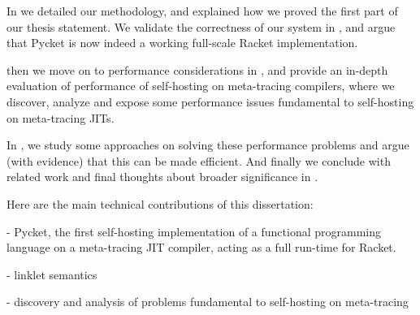     \begin{paragraph-here}%
        In  we detailed our methodology, and explained how we proved the first part of our thesis statement. We validate the correctness of our system in , and argue that Pycket is now indeed a working full-scale Racket implementation.
    \end{paragraph-here}

    \begin{paragraph-here}%
        then we move on to performance considerations in , and provide an in-depth evaluation of performance of self-hosting on meta-tracing compilers, where we discover, analyze and expose some performance issues fundamental to self-hosting on meta-tracing JITs.
    \end{paragraph-here}

    \begin{paragraph-here}%
        In , we study some approaches on solving these performance problems and argue (with evidence) that this can be made efficient. And finally we conclude with related work and final thoughts about broader significance in .
    \end{paragraph-here}

    \begin{paragraph-here}%
        Here are the main technical contributions of this dissertation:

        - Pycket, the first self-hosting implementation of a functional programming language on a meta-tracing JIT compiler, acting as a full run-time for Racket.

        - linklet semantics

        - discovery and analysis of problems fundamental to self-hosting on meta-tracing
    \end{paragraph-here}





